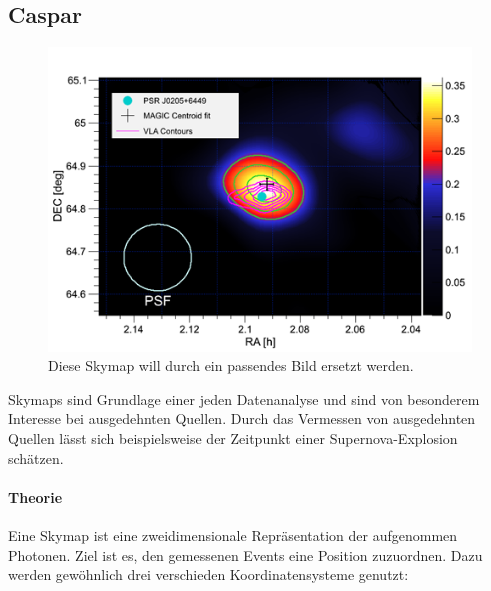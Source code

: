 \subsection{Caspar}%
\label{sub:caspar}

\begin{figure}
    \centering
    \includegraphics[width=\linewidth]{pictures/skymap.png}
    \caption{Diese Skymap will durch ein passendes Bild ersetzt werden.}%
    \label{fig:skymap}
\end{figure}

Skymaps sind Grundlage einer jeden Datenanalyse
und sind von besonderem Interesse bei ausgedehnten Quellen.
Durch das Vermessen von ausgedehnten Quellen
lässt sich beispielsweise der Zeitpunkt einer Supernova-Explosion schätzen.

\paragraph{Theorie}%
\label{par:theorie}

Eine Skymap ist eine zweidimensionale Repräsentation der aufgenommen Photonen.
Ziel ist es, den gemessenen Events eine Position zuzuordnen.
Dazu werden ge\-wöhn\-lich drei verschieden Koordinatensysteme genutzt:

